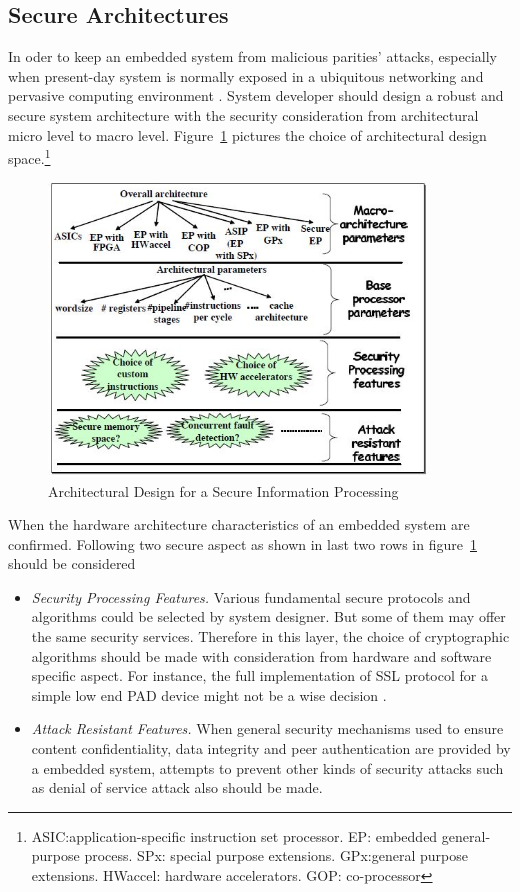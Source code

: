 \subsection{Secure Architectures}
In oder to keep an embedded system from malicious parities' attacks, especially when present-day system is normally exposed in a ubiquitous networking and pervasive computing environment \cite{embedded_secure}. System developer should design a robust and secure system architecture with the security consideration from architectural micro level to macro level. Figure~\ref{fig:design-space} pictures the choice of architectural design space.\footnote{ASIC:application-specific instruction set processor. EP: embedded general-purpose process. SPx: special purpose extensions. GPx:general purpose extensions. HWaccel: hardware accelerators. GOP: co-processor}
\begin{figure}[htb]
	\centering
	\includegraphics[width=0.9\textwidth]{design-space.jpg}
		\caption{Architectural Design for a Secure Information Processing \cite{embedded_secure}}
	\label{fig:design-space}
\end{figure}

When the hardware architecture characteristics of an embedded system are confirmed. Following two secure aspect as shown in last two rows in figure~\ref{fig:design-space} should be considered
\begin{itemize}
\item \emph{Security Processing Features.} Various fundamental secure protocols and algorithms could be selected by system designer. But some of them may offer the same security services. Therefore in this layer, the choice of cryptographic algorithms should be made with consideration from hardware and software specific aspect. For instance, the full implementation of SSL protocol for a simple low end PAD device might not be a wise decision \cite{embedded_secure}.
\item \emph{Attack Resistant Features.} When general security mechanisms used to ensure content confidentiality, data integrity and peer authentication are provided by a embedded system, attempts to prevent other kinds of security attacks such as denial of service attack also should be made.
\end{itemize}

